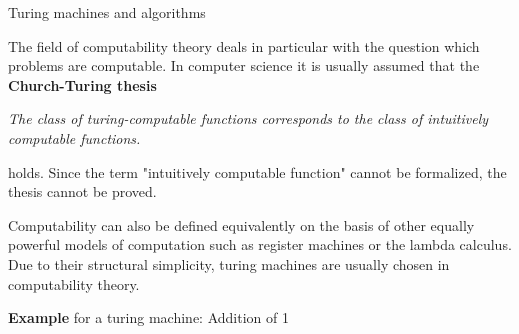 \documentclass[11pt,compress,t,notes=noshow, xcolor=table]{beamer}
\begin{document}
\begin{vbframe}{Turing machines and algorithms}
\framebreak

The field of computability theory deals in particular with the question which problems are computable. In computer science it is usually assumed that the \textbf{Church-Turing thesis}

\begin{center}
\begin{minipage}{0.9\textwidth}
\emph{The class of turing-computable functions corresponds to the class of intuitively computable functions. } \\
\end{minipage}
\end{center}

holds. Since the term "intuitively computable function" cannot be formalized, the thesis cannot be proved.

\vfill

\begin{footnotesize}
Computability can also be defined equivalently on the basis of other equally powerful models of computation such as register machines or the lambda calculus. Due to their structural simplicity, turing machines are usually chosen in computability theory.
\end{footnotesize}

\framebreak

\textbf{Example} for a turing machine: Addition of 1


\begin{figure}[widht=0.6\textwidth]
\end{figure}
\end{vbframe}
\end{document}
